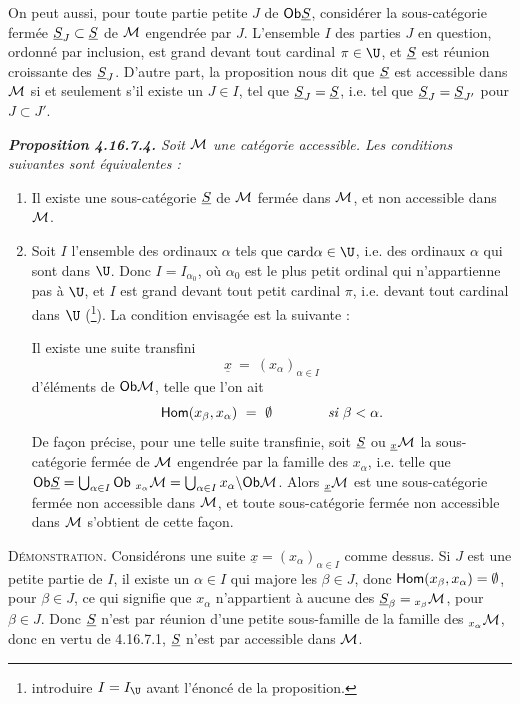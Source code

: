 On peut aussi, pour toute partie petite $J$ de $\mathsf{Ob} \underline{S}$, considérer la sous-catégorie fermée $\underline{S}_J \subset \underline{S}$ de $\mathcal{M}$ engendrée par $J$. L'ensemble $I$ des parties $J$ en question, ordonné par inclusion, est grand devant tout cardinal $\pi \in \U$, et $\underline{S}$ est réunion croissante des $\underline{S}_J$. D'autre part, la proposition nous dit que $\underline{S}$ est accessible dans $\mathcal{M}$ si et seulement s'il existe un $J \in I$, tel que $\underline{S}_J = \underline{S}$, i.e. tel que $\underline{S}_J = \underline{S}_{J'}$ pour $J \subset J'$.

\begingroup\itshape
\noindent\textbf{\upshape Proposition 4.16.7.4.} Soit $\mathcal{M}$ une catégorie accessible. Les conditions suivantes sont équivalentes :
\begin{enumerate}[label={}]
\item[a)] Il existe une sous-catégorie $\underline{S}$ de $\mathcal{M}$ fermée dans $\mathcal{M}$, et non accessible dans $\mathcal{M}$.
\item[b)] Soit $I$ l'ensemble des ordinaux $\alpha$ tels que $\card \alpha \in \U$, i.e. des
ordinaux $\alpha$ qui sont dans $\U$. Donc $I = I_{\alpha_0}$, où $\alpha_0$ est le plus petit ordinal qui n'appartienne pas à $\U$, et $I$ est grand devant tout petit cardinal $\pi$, i.e. devant tout cardinal dans $\U$ \textup{(}\footnote{introduire $I = I_{\U}$ avant l'énoncé de la proposition.}\textup{)}. La condition envisagée est la suivante :

Il existe une suite transfini %
\[
\underline{x} \ =\ (x_\alpha)_{\alpha\in I}
\]
d'éléments de $\mathsf{Ob} \mathcal{M}$, telle que l'on ait
\[
\mathsf{Hom}(x_\beta, x_\alpha) \ =\ \emptyset \qquad\qquad \textit{si } \beta < \alpha.
\]
De façon précise, pour une telle suite transfinie, soit $\underline{S}$ ou ${}_{\underline{x}}\mathcal{M}$ la sous-catégorie fermée de $\mathcal{M}$ engendrée par la famille des $x_\alpha$, i.e. telle que $\mathsf{Ob} \underline{S} = \bigcup_{\alpha\in I} \mathsf{Ob}\ {}_{x_\alpha}\mathcal{M} = \bigcup_{\alpha\in I} x_\alpha\backslash\mathsf{Ob} \mathcal{M}$. Alors ${}_{\underline{x}}\mathcal{M}$ est une sous-catégorie fermée non accessible dans $\mathcal{M}$, et toute sous-catégorie fermée non accessible dans $\mathcal{M}$ s'obtient de cette façon.
\end{enumerate}
\endgroup

\textsc{Démonstration}. Considérons une suite $\underline{x} = (x_\alpha)_{\alpha\in I}$ comme dessus. Si $J$ est une petite partie de $I$, il existe un $\alpha \in I$ qui majore les $\beta \in J$, donc $\mathsf{Hom}(x_\beta, x_\alpha) = \emptyset$, pour $\beta \in J$,
ce qui signifie que $x_\alpha$ n'appartient à aucune des $\underline{S}_\beta = {}_{x_\beta}\mathcal{M}$, pour $\beta \in J$. Donc $\underline{S}$ n'est par réunion d'une petite sous-famille de la famille des ${}_{x_\alpha}\mathcal{M}$, donc en vertu de 4.16.7.1, $\underline{S}$ n'est par accessible dans $\mathcal{M}$. %

